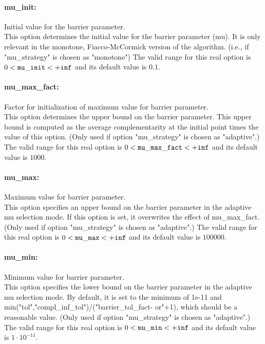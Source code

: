 \paragraph{mu\_init:}\label{opt:mu_init} Initial value for the barrier parameter. \\
 This option determines the initial value for the
barrier parameter (mu).  It is only relevant in
the monotone, Fiacco-McCormick version of the
algorithm. (i.e., if "mu\_strategy" is chosen as
"monotone") The valid range for this real option is 
$0 <  {\tt mu\_init } <  {\tt +inf}$
and its default value is $0.1$.


\paragraph{mu\_max\_fact:}\label{opt:mu_max_fact} Factor for initialization of maximum value for barrier parameter. \\
 This option determines the upper bound on the
barrier parameter.  This upper bound is computed
as the average complementarity at the initial
point times the value of this option. (Only used
if option "mu\_strategy" is chosen as "adaptive".) The valid range for this real option is 
$0 <  {\tt mu\_max\_fact } <  {\tt +inf}$
and its default value is $1000$.


\paragraph{mu\_max:}\label{opt:mu_max} Maximum value for barrier parameter. \\
 This option specifies an upper bound on the
barrier parameter in the adaptive mu selection
mode.  If this option is set, it overwrites the
effect of mu\_max\_fact. (Only used if option
"mu\_strategy" is chosen as "adaptive".) The valid range for this real option is 
$0 <  {\tt mu\_max } <  {\tt +inf}$
and its default value is $100000$.


\paragraph{mu\_min:}\label{opt:mu_min} Minimum value for barrier parameter. \\
 This option specifies the lower bound on the
barrier parameter in the adaptive mu selection
mode. By default, it is set to the minimum of
1e-11 and
min("tol","compl\_inf\_tol")/("barrier\_tol\_fact-
or"+1), which should be a reasonable value. (Only
used if option "mu\_strategy" is chosen as
"adaptive".) The valid range for this real option is 
$0 <  {\tt mu\_min } <  {\tt +inf}$
and its default value is $1 \cdot 10^{-11}$.


